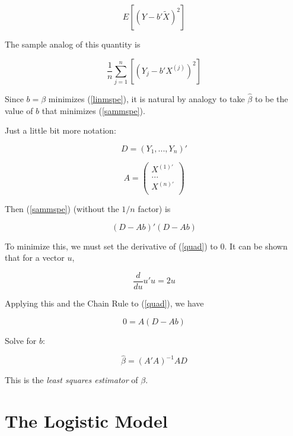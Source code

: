 \begin{equation}
\label{linmspe}
E \left [ (Y - b' \widetilde{X})^2 \right ]
\end{equation}

The sample analog of this quantity is

\begin{equation}
\label{sammspe}
\frac{1}{n}
\sum_{j=1}^n \left [ (Y_j - b' X^{(j)})^2 \right ]
\end{equation}

Since $b = \beta$ minimizes (\ref{linmspe}), it is natural by analogy to
take $\widehat{\beta}$ to be the value of $b$ that minimizes
(\ref{sammspe}).

Just a little bit more notation:

\begin{equation}
D = (Y_1,...,Y_n)'
\end{equation}

\begin{equation}
A = 
\left (
\begin{array}{r}
X^{(1)'} \\
... \\
X^{(n)'} \\
\end{array}
\right )
\end{equation}

Then (\ref{sammspe}) (without the $1/n$ factor) is

\begin{equation}
\label{quad}
(D - Ab)'(D - Ab)
\end{equation}

To minimize this, we must set the derivative of (\ref{quad}) to 0.  It
can be shown that for a vector $u$, 

\begin{equation}
\frac{d}{du} u'u = 2u
\end{equation}

Applying this and the Chain Rule to (\ref{quad}), we have

\begin{equation}
0 = A (D - Ab) 
\end{equation}

Solve for $b$:

\begin{equation}
\widehat{\beta} = (A'A)^{-1} AD
\end{equation}

This is the \textit{least squares estimator} of $\beta$.
\section{The Logistic Model}

